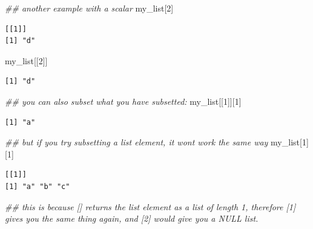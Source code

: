 \documentclass[
  letterpaper,
  DIV=11,
  numbers=noendperiod]{scrreprt}
\newenvironment{Shaded}{\begin{snugshade}}{\end{snugshade}}
\newcommand{\DecValTok}[1]{\textcolor[rgb]{0.68,0.00,0.00}{#1}}
\newcommand{\DocumentationTok}[1]{\textcolor[rgb]{0.37,0.37,0.37}{\textit{#1}}}
\newcommand{\NormalTok}[1]{\textcolor[rgb]{0.00,0.23,0.31}{#1}}
\begin{document}
\begin{Shaded}
\begin{Highlighting}[]
\DocumentationTok{\#\# another example with a scalar}
\NormalTok{my\_list[}\DecValTok{2}\NormalTok{]}
\end{Highlighting}
\end{Shaded}

\begin{verbatim}
[[1]]
[1] "d"
\end{verbatim}

\begin{Shaded}
\begin{Highlighting}[]
\NormalTok{my\_list[[}\DecValTok{2}\NormalTok{]]}
\end{Highlighting}
\end{Shaded}

\begin{verbatim}
[1] "d"
\end{verbatim}

\begin{Shaded}
\begin{Highlighting}[]
\DocumentationTok{\#\# you can also subset what you have subsetted:}
\NormalTok{my\_list[[}\DecValTok{1}\NormalTok{]][}\DecValTok{1}\NormalTok{]}
\end{Highlighting}
\end{Shaded}

\begin{verbatim}
[1] "a"
\end{verbatim}

\begin{Shaded}
\begin{Highlighting}[]
\DocumentationTok{\#\# but if you try subsetting a list element, it won\textquotesingle{}t work the same way}
\NormalTok{my\_list[}\DecValTok{1}\NormalTok{][}\DecValTok{1}\NormalTok{]}
\end{Highlighting}
\end{Shaded}

\begin{verbatim}
[[1]]
[1] "a" "b" "c"
\end{verbatim}

\begin{Shaded}
\begin{Highlighting}[]
\DocumentationTok{\#\# this is because [] returns the list element as a list of length 1, therefore [1] gives you the same thing again, and [2] would give you a NULL list.}
\end{Highlighting}
\end{Shaded}
\end{document}
